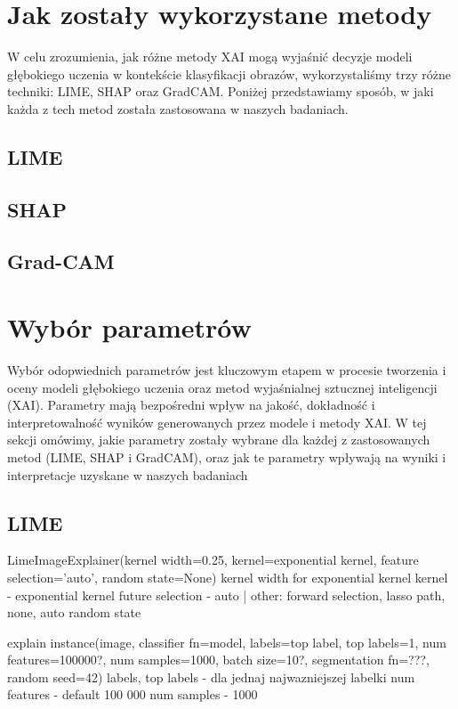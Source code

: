 \section*{Jak zostały wykorzystane metody}
W celu zrozumienia, jak różne metody XAI mogą wyjaśnić decyzje modeli głębokiego uczenia w kontekście klasyfikacji obrazów, wykorzystaliśmy trzy różne techniki: LIME, SHAP oraz GradCAM.
Poniżej przedstawiamy sposób, w jaki każda z tech metod została zastosowana w naszych badaniach.

\subsection*{LIME}

\subsection*{SHAP}

\subsection*{Grad-CAM}

\section*{Wybór parametrów}
Wybór odopwiednich parametrów jest kluczowym etapem w procesie tworzenia i oceny modeli głębokiego uczenia oraz metod wyjaśnialnej sztucznej inteligencji (XAI).
Parametry mają bezpośredni wpływ na jakość, dokładność i interpretowalność wyników generowanych przez modele i metody XAI.
W tej sekcji omówimy, jakie parametry zostały wybrane dla każdej z zastosowanych metod (LIME, SHAP i GradCAM), oraz jak te parametry wpływają na wyniki i interpretacje uzyskane w naszych badaniach

\subsection*{LIME}
LimeImageExplainer(kernel width=0.25, kernel=exponential kernel, feature selection='auto', random state=None)
kernel width for exponential kernel
kernel - exponential kernel
future selection - auto | other: forward selection, lasso path, none, auto
random state

explain instance(image, classifier fn=model, labels=top label, top labels=1, num features=100000?, num samples=1000, batch size=10?, segmentation fn=???, random seed=42)
labels, top labels - dla jednaj najwazniejszej labelki
num features - default 100 000
num samples - 1000

